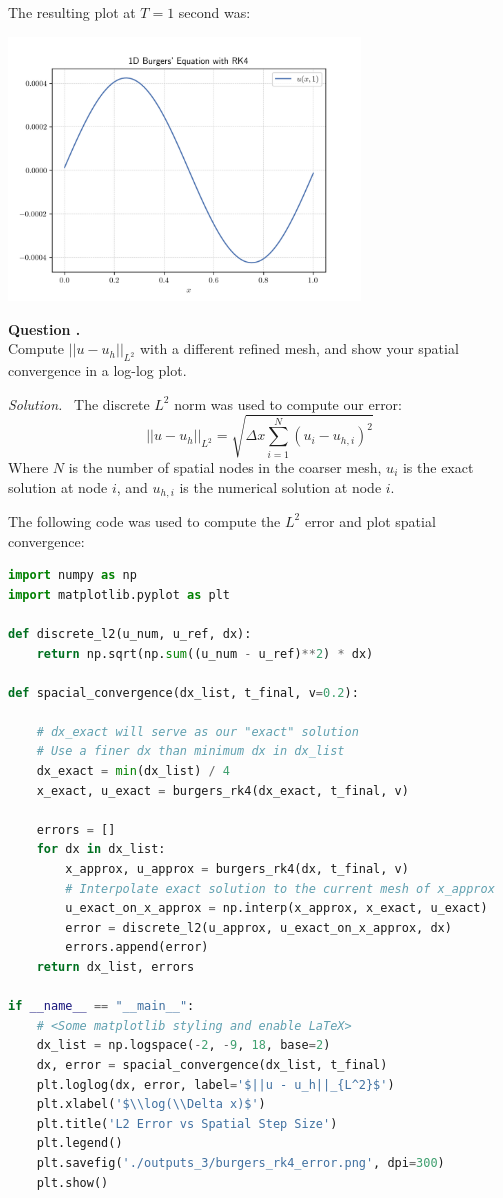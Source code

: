 \documentclass[12pt]{article}
\newcounter{question}
\newcounter{subquest}
\newcommand{\subquestion}{
    \stepcounter{subquest} 
    \vspace{.5em}
    \textbf{\large Question \thequestion.\thesubquest}
    \vspace{.25em}\ \\}
\newcommand{\solution}
    {\par\vspace{0.5em}\noindent\emph{Solution.}\ }
    {\par\vspace{1em}}
\begin{document}
The resulting plot at $T=1$ second was:
\begin{center}
\includegraphics[width=0.7\textwidth]{../outputs_3/burgers_rk4.png}
\end{center}


\subquestion
Compute $||u-u_h||_{L^2}$ with a different refined 
mesh, and show your spatial convergence in a log-log
plot.

\solution
The discrete $L^2$ norm was used to compute our error:
\[||u - u_h||_{L^2} = \sqrt{\Delta x \sum_{i=1}^{N}(u_i - u_{h,i})^2}\]
Where $N$ is the number of spatial nodes in the coarser mesh, $u_i$ is the exact solution at node $i$, and $u_{h,i}$ is the numerical solution at node $i$.

The following code was used to compute the $L^2$ error and plot spatial convergence:
\begin{lstlisting}[language=Python, caption=3.3 Python]
import numpy as np
import matplotlib.pyplot as plt

def discrete_l2(u_num, u_ref, dx):
    return np.sqrt(np.sum((u_num - u_ref)**2) * dx)

def spacial_convergence(dx_list, t_final, v=0.2):
    
    # dx_exact will serve as our "exact" solution
    # Use a finer dx than minimum dx in dx_list
    dx_exact = min(dx_list) / 4
    x_exact, u_exact = burgers_rk4(dx_exact, t_final, v)
    
    errors = []
    for dx in dx_list:
        x_approx, u_approx = burgers_rk4(dx, t_final, v)
        # Interpolate exact solution to the current mesh of x_approx
        u_exact_on_x_approx = np.interp(x_approx, x_exact, u_exact)
        error = discrete_l2(u_approx, u_exact_on_x_approx, dx)
        errors.append(error)
    return dx_list, errors

if __name__ == "__main__":
    # <Some matplotlib styling and enable LaTeX>
    dx_list = np.logspace(-2, -9, 18, base=2)
    dx, error = spacial_convergence(dx_list, t_final)
    plt.loglog(dx, error, label='$||u - u_h||_{L^2}$')
    plt.xlabel('$\\log(\\Delta x)$')
    plt.title('L2 Error vs Spatial Step Size')
    plt.legend()
    plt.savefig('./outputs_3/burgers_rk4_error.png', dpi=300)
    plt.show()
\end{lstlisting}
\end{document}
